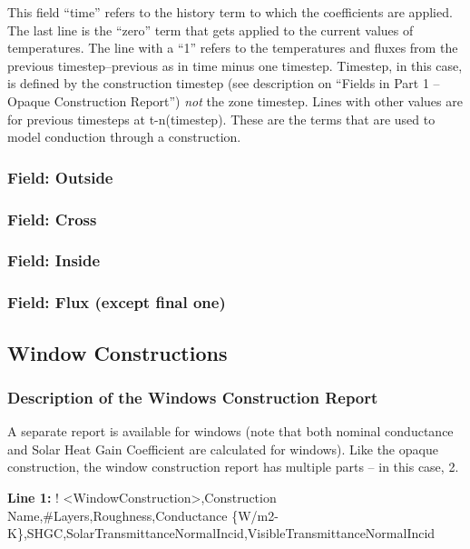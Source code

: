This field ``time'' refers to the history term to which the coefficients are applied. The last line is the ``zero'' term that gets applied to the current values of temperatures. The line with a ``1'' refers to the temperatures and fluxes from the previous timestep--previous as in time minus one timestep. Timestep, in this case, is defined by the construction timestep (see description on ``Fields in Part 1 -- Opaque Construction Report'') \emph{not} the zone timestep. Lines with other values are for previous timesteps at t-n(timestep). These are the terms that are used to model conduction through a construction.

\subsubsection{Field: Outside}\label{field-outside}

\subsubsection{Field: Cross}\label{field-cross}

\subsubsection{Field: Inside}\label{field-inside}

\subsubsection{Field: Flux (except final one)}\label{field-flux-except-final-one}

\subsection{Window Constructions}\label{window-constructions}

\subsubsection{Description of the Windows Construction Report}\label{description-of-the-windows-construction-report}

A separate report is available for windows (note that both nominal conductance and Solar Heat Gain Coefficient are calculated for windows). Like the opaque construction, the window construction report has multiple parts -- in this case, 2.

\textbf{Line 1:} ! \textless{}WindowConstruction\textgreater{},Construction Name,\#Layers,Roughness,Conductance \{W/m2-K\},SHGC,SolarTransmittanceNormalIncid,VisibleTransmittanceNormalIncid

